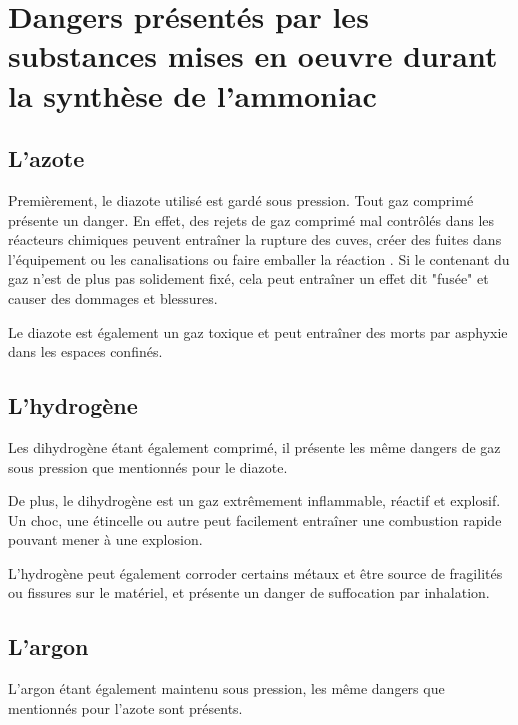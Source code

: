 

\section{Dangers présentés par les substances mises en oeuvre durant la synthèse de l'ammoniac}
\subsection{L'azote}
Premièrement, le diazote utilisé est gardé sous pression. Tout gaz comprimé présente un danger. 
En effet, des rejets de gaz comprimé mal contrôlés dans les réacteurs chimiques peuvent entraîner 
la rupture des cuves, créer des fuites dans l'équipement ou les canalisations ou faire emballer la réaction \cite{canada}.
Si le contenant du gaz n'est de plus pas solidement fixé, cela peut entraîner un effet dit "fusée" 
et causer des dommages et blessures.

Le diazote est également un gaz toxique et peut entraîner des morts par asphyxie dans les espaces confinés. 

\subsection{L'hydrogène}
Les dihydrogène étant également comprimé, il présente les même dangers de gaz sous 
pression que mentionnés pour le diazote.

De plus, le dihydrogène est un gaz extrêmement inflammable, réactif et explosif. 
Un choc, une étincelle ou autre peut facilement 
entraîner une combustion rapide pouvant mener à une explosion.

L'hydrogène peut également corroder certains métaux et être source de fragilités
ou fissures sur le matériel, et présente un danger de suffocation par inhalation.

\subsection{L'argon}
L'argon étant également maintenu sous pression, les même dangers que mentionnés
pour l'azote sont présents.

